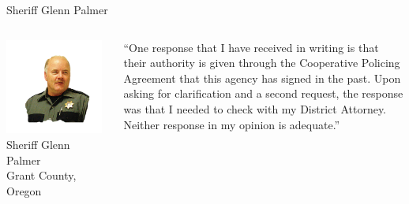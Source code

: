 
% 
\begin{frame}{Sheriff Glenn Palmer}
    \begin{columns}[onlytextwidth]
            \centering
            \includegraphics[width=0.95\textwidth]{img/glenn-palmer.png}
            \\ Sheriff Glenn Palmer
            \\ Grant County, Oregon

            ``One response that I have received in writing is that their
            authority is given through the Cooperative Policing Agreement that
            this agency has signed in the past. Upon asking for clarification
            and a second request, the response was that I needed to check with
            my District Attorney. Neither response in my opinion is adequate.''
    \end{columns}
\end{frame}

